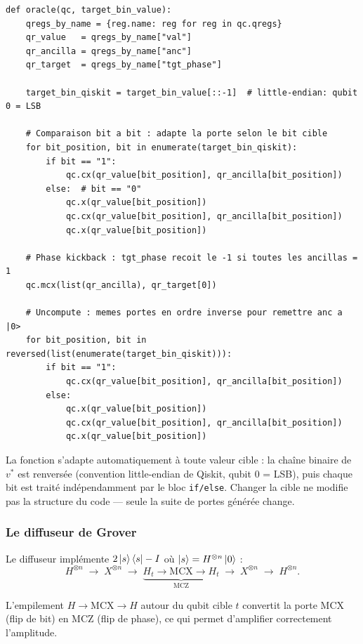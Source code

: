 \documentclass{ceri/sty/rapport}
\begin{document}
\begin{lstlisting}
def oracle(qc, target_bin_value):
    qregs_by_name = {reg.name: reg for reg in qc.qregs}
    qr_value   = qregs_by_name["val"]
    qr_ancilla = qregs_by_name["anc"]
    qr_target  = qregs_by_name["tgt_phase"]

    target_bin_qiskit = target_bin_value[::-1]  # little-endian: qubit 0 = LSB

    # Comparaison bit a bit : adapte la porte selon le bit cible
    for bit_position, bit in enumerate(target_bin_qiskit):
        if bit == "1":
            qc.cx(qr_value[bit_position], qr_ancilla[bit_position])
        else:  # bit == "0"
            qc.x(qr_value[bit_position])
            qc.cx(qr_value[bit_position], qr_ancilla[bit_position])
            qc.x(qr_value[bit_position])

    # Phase kickback : tgt_phase recoit le -1 si toutes les ancillas = 1
    qc.mcx(list(qr_ancilla), qr_target[0])

    # Uncompute : memes portes en ordre inverse pour remettre anc a |0>
    for bit_position, bit in reversed(list(enumerate(target_bin_qiskit))):
        if bit == "1":
            qc.cx(qr_value[bit_position], qr_ancilla[bit_position])
        else:
            qc.x(qr_value[bit_position])
            qc.cx(qr_value[bit_position], qr_ancilla[bit_position])
            qc.x(qr_value[bit_position])
\end{lstlisting}

La fonction s'adapte automatiquement à toute valeur cible : la chaîne binaire
de $v^*$ est renversée (convention little-endian de Qiskit, qubit $0$ = LSB),
puis chaque bit est traité indépendamment par le bloc \texttt{if/else}.
Changer la cible ne modifie pas la structure du code — seule la suite de
portes générée change.

\subsubsection{Le diffuseur de Grover}

Le diffuseur implémente $2\ket{s}\bra{s} - I$ où $\ket{s} = H^{\otimes n}\ket{0}$ :
\[
  H^{\otimes n} \;\to\; X^{\otimes n} \;\to\;
  \underbrace{H_t \to \mathrm{MCX} \to H_t}_{\mathrm{MCZ}} \;\to\;
  X^{\otimes n} \;\to\; H^{\otimes n}.
\]

L'empilement $H \to \mathrm{MCX} \to H$ autour du qubit cible $t$ convertit la
porte MCX (flip de bit) en MCZ (flip de phase), ce qui permet d'amplifier correctement l'amplitude.
\end{document}
